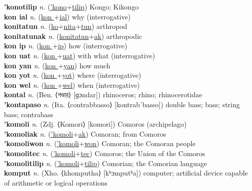 \textbf{'konotilip} \textit{n.} (\hyperref['kono]{'kono}+\hyperref[tilip]{tilip})
Kongo; Kikongo \label{'konotilip} \\
\textbf{kon ial} \textit{n.} (\hyperref[kon ]{kon }+\hyperref[al]{ial})
why (interrogative) \label{kon ial} \\
\textbf{konitatun} \textit{n.} (\hyperref[ko]{ko}+\hyperref[nita]{nita}+\hyperref[tun]{tun})
arthropod \label{konitatun} \\
\textbf{konitatunak} \textit{n.} (\hyperref[konitatun]{konitatun}+\hyperref[ak]{ak})
arthropodic \label{konitatunak} \\
\textbf{kon ip} \textit{n.} (\hyperref[kon ]{kon }+\hyperref[p]{ip})
how (interrogative) \label{kon ip} \\
\textbf{kon uat} \textit{n.} (\hyperref[kon ]{kon }+\hyperref[at]{uat})
with what (interrogative) \label{kon uat} \\
\textbf{kon yan} \textit{n.} (\hyperref[kon ]{kon }+\hyperref[an]{yan})
how much \label{kon yan} \\
\textbf{kon yot} \textit{n.} (\hyperref[kon ]{kon }+\hyperref[ot]{yot})
where (interrogative) \label{kon yot} \\
\textbf{kon wel} \textit{n.} (\hyperref[kon ]{kon }+\hyperref[el]{wel})
when (interrogative) \label{kon wel} \\
\textbf{kontal} \textit{n.} (Ben. ⟨গণ্ডার⟩ [ɡɔndar])
rhinoceros; rhino; rhinocerotidae \label{kontal} \\
\textbf{'kontapaso} \textit{n.} (Ita. ⟨contrabbasso⟩ [kontrabˈbasso])
double bass; bass; string bass; contrabass \label{'kontapaso} \\
\textbf{'komoli} \textit{n.} (Zdj. ⟨Komori⟩ [komori])
Comoros (archipelago) \label{'komoli} \\
\textbf{'komoliak} \textit{n.} (\hyperref['komoli]{'komoli}+\hyperref[ak]{ak})
Comoran; from Comoros \label{'komoliak} \\
\textbf{'komoliwon} \textit{n.} (\hyperref['komoli]{'komoli}+\hyperref[won]{won})
Comoran; the Comoran people \label{'komoliwon} \\
\textbf{'komolitec} \textit{n.} (\hyperref['komoli]{'komoli}+\hyperref[tec]{tec})
Comoros; the Union of the Comoros \label{'komolitec} \\
\textbf{'komolitilip} \textit{n.} (\hyperref['komoli]{'komoli}+\hyperref[tilip]{tilip})
Comorian; the Comorian language \label{'komolitilip} \\
\textbf{komput} \textit{n.} (Xho. ⟨khomputha⟩ [kʰɔmputʰa])
computer; artificial device capable of arithmetic or logical operations \label{komput} \\
